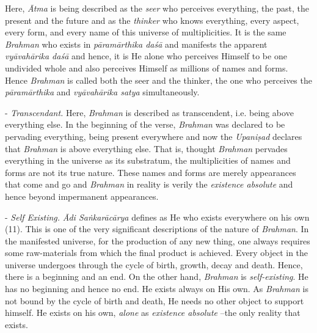 Here, \emph{Ātma} is being described as the \emph{seer} who perceives everything, the past, the present and the future and as the \emph{thinker} who knows everything, every aspect, every form, and every name of this universe of multiplicities. It is the same \emph{Brahman} who exists in \emph{pāramārthika daśā} and manifests the apparent \emph{vyāvahārika daśā} and hence, it is He alone who perceives Himself to be one undivided whole and also perceives Himself as millions of names and forms. Hence \emph{Brahman} is called both the seer and the thinker, the one who perceives the \emph{pāramārthika} and \emph{vyāvahārika satya} simultaneously.

- \emph{Transcendant.} Here, \emph{Brahman} is described as transcendent, i.e. being above everything else. In the beginning of the verse, \emph{Brahman} was declared to be pervading everything, being present everywhere and now the \emph{Upaniṣad} declares that \emph{Brahman} is above everything else. That is, thought \emph{Brahman} pervades everything in the universe as its substratum, the multiplicities of names and forms are not its true nature. These names and forms are merely appearances that come and go and \emph{Brahman} in reality is verily the \emph{existence absolute} and hence beyond impermanent appearances.

- \emph{Self Existing.} \emph{Ādi Saṅkarācārya} defines  as He who exists everywhere on his own (11). This is one of the very significant descriptions of the nature of \emph{Brahman}. In the manifested universe, for the production of any new thing, one always requires some raw-materials from which the final product is achieved. Every object in the universe undergoes through the cycle of birth, growth, decay and death. Hence, there is a beginning and an end. On the other hand, \emph{Brahman} is \emph{self-existing}. He has no beginning and hence no end. He exists always on His own. As \emph{Brahman} is not bound by the cycle of birth and death, He needs no other object to support himself. He exists on his own, \emph{alone} as \emph{existence absolute} --the only reality that exists.

